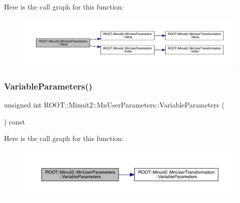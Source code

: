 Here is the call graph for this function\+:
\nopagebreak
\begin{figure}[H]
\begin{center}
\leavevmode
\includegraphics[width=350pt]{d6/d10/classROOT_1_1Minuit2_1_1MnUserParameters_a4d08de604380552a826ac23ca4978767_cgraph}
\end{center}
\end{figure}
\mbox{\label{classROOT_1_1Minuit2_1_1MnUserParameters_af19ee84626fbdeb819e6a86e82794f19}} 
\subsubsection{\texorpdfstring{VariableParameters()}{VariableParameters()}\hspace{0.1cm}{\footnotesize\ttfamily [1/3]}}
{\footnotesize\ttfamily unsigned int R\+O\+O\+T\+::\+Minuit2\+::\+Mn\+User\+Parameters\+::\+Variable\+Parameters (\begin{DoxyParamCaption}{ }\end{DoxyParamCaption}) const\hspace{0.3cm}{\ttfamily [inline]}}

Here is the call graph for this function\+:
\nopagebreak
\begin{figure}[H]
\begin{center}
\leavevmode
\includegraphics[width=350pt]{d6/d10/classROOT_1_1Minuit2_1_1MnUserParameters_af19ee84626fbdeb819e6a86e82794f19_cgraph}
\end{center}
\end{figure}
\mbox{\label{classROOT_1_1Minuit2_1_1MnUserParameters_af19ee84626fbdeb819e6a86e82794f19}} 
